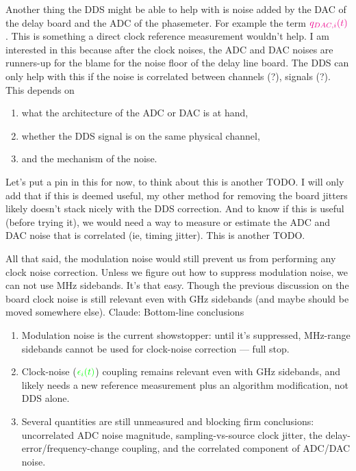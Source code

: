\documentclass[11pt]{article}
\begin{document}
Another thing the DDS might be able to help with is noise added by the DAC of the delay board and the ADC of the phasemeter. For example the term $ {\color{magenta}q_{DAC,i}(t)}$. This is something a direct clock reference measurement wouldn't help. I am interested in this because after the clock noises, the ADC and DAC noises are runners-up for the blame for the noise floor of the delay line board. The DDS can only help with this if the noise is correlated between channels (?), signals (?). This depends on 
\begin{enumerate}
    \item  what the architecture of the ADC or DAC is at hand,
    \item whether the DDS signal is on the same physical channel,
    \item and the mechanism of the noise.
\end{enumerate}
Let's put a pin in this for now, to think about this is another {\color{red} TODO}. I will only add that if this is deemed useful, my other method for removing the board jitters likely doesn't stack nicely with the DDS correction. And to know if this is useful (before trying it), we would need a way to measure or estimate the ADC and DAC noise that is correlated (ie, timing jitter). This is another {\color{red} TODO}.

All that said, the modulation noise would still prevent us from performing any clock noise correction. Unless we figure out how to suppress modulation noise, we can not use MHz sidebands. It's that easy. Though the previous discussion on the board clock noise is still relevant even with GHz sidebands (and maybe should be moved somewhere else). 
Claude: Bottom-line conclusions
\begin{enumerate}
    \item Modulation noise is the current showstopper: until it's suppressed, MHz-range sidebands cannot be used for clock-noise correction — full stop.
    \item Clock-noise (${\color{green}\epsilon_{i}(t)}$) coupling remains relevant even with GHz sidebands, and likely needs a new reference measurement plus an algorithm modification, not DDS alone.
    \item Several quantities are still unmeasured and blocking firm conclusions: uncorrelated ADC noise magnitude, sampling-vs-source clock jitter, the delay-error/frequency-change coupling, and the correlated component of ADC/DAC noise.
\end{enumerate}
\end{document}

